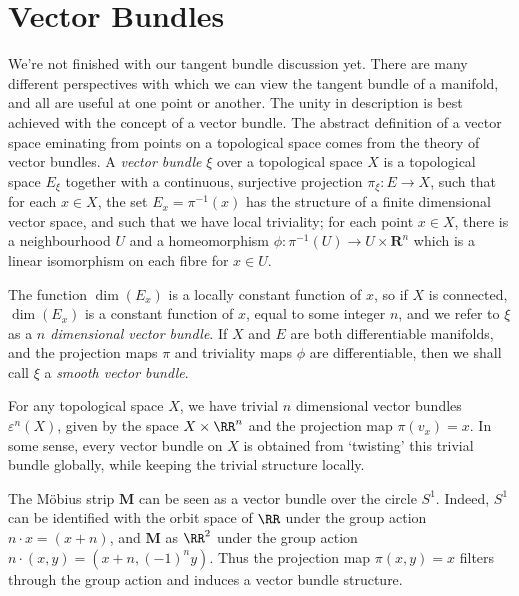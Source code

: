 \section{Vector Bundles}

We're not finished with our tangent bundle discussion yet. There are many different perspectives with which we can view the tangent bundle of a manifold, and all are useful at one point or another. The unity in description is best achieved with the concept of a vector bundle. The abstract definition of a vector space eminating from points on a topological space comes from the theory of vector bundles. A \emph{vector bundle} $\xi$ over a topological space $X$ is a topological space $E_\xi$ together with a continuous, surjective projection $\pi_\xi: E \to X$, such that for each $x \in X$, the set $E_x = \pi^{-1}(x)$ has the structure of a finite dimensional vector space, and such that we have local triviality; for each point $x \in X$, there is a neighbourhood $U$ and a homeomorphism $\phi: \pi^{-1}(U) \to U \times \mathbf{R}^n$ which is a linear isomorphism on each fibre for $x \in U$.

The function $\dim(E_x)$ is a locally constant function of $x$, so if $X$ is connected, $\dim(E_x)$ is a constant function of $x$, equal to some integer $n$, and we refer to $\xi$ as a \emph{$n$ dimensional vector bundle}. If $X$ and $E$ are both differentiable manifolds, and the projection maps $\pi$ and triviality maps $\phi$ are differentiable, then we shall call $\xi$ a \emph{smooth vector bundle}.

\begin{example}
    For any topological space $X$, we have trivial $n$ dimensional vector bundles $\varepsilon^n(X)$, given by the space $X \times \RR^n$ and the projection map $\pi(v_x) = x$. In some sense, every vector bundle on $X$ is obtained from `twisting' this trivial bundle globally, while keeping the trivial structure locally.
\end{example}

\begin{example}
    The M\"{o}bius strip $\mathbf{M}$ can be seen as a vector bundle over the circle $S^1$. Indeed, $S^1$ can be identified with the orbit space of $\RR$ under the group action $n \cdot x = (x + n)$, and $\mathbf{M}$ as $\RR^2$ under the group action $n \cdot (x,y) = (x + n, (-1)^n y)$. Thus the projection map $\pi(x,y) = x$ filters through the group action and induces a vector bundle structure.
\end{example}

